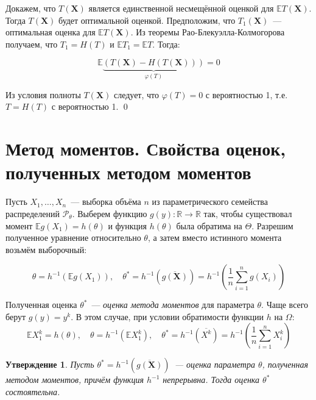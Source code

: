\documentclass[oneside,final,14pt]{extreport}
\renewenvironment{proof}{{\bfseries Доказательство.}}{\qed}
\theoremstyle{plain}
\newtheorem*{thm*}{Утверждение}
\theoremstyle{definition}
\theoremstyle{named}
\begin{document}
\begin{proof}
Докажем, что $T(\mathbf{X})$ является единственной несмещённой оценкой для $\mathbb{E}T(\mathbf{X})$. Тогда $T(\mathbf{X})$ будет оптимальной оценкой. Предположим, что $T_1(\mathbf{X})$~--- оптимальная оценка для $\mathbb{E}T(\mathbf{X})$. Из теоремы Рао-Блекуэлла-Колмогорова получаем, что $T_{1}=H(T)$ и $\mathbb{E} T_{1}=\mathbb{E} T$. Тогда:

\begin{equation*}
    \mathbb{E} \underbrace{(T(\mathbf{X})-H(T(\mathbf{X})))}_{\varphi(T)}=0
\end{equation*}

Из условия полноты $T(\mathbf{X})$ следует, что $\varphi(T)=0$ с вероятностью 1, т.е. $T=H(T)$ с вероятностью 1.
\end{proof}

\section{Метод моментов. Свойства оценок, полученных методом моментов}

Пусть $X_1, \ldots, X_n$~--- выборка объёма $n$ из параметрического семейства распределений $\mathcal{P}_\theta$. Выберем функцию $g(y): \mathbb{R} \rightarrow \mathbb{R}$ так, чтобы существовал момент $\mathbb{E} g\left(X_{1}\right)=h(\theta)$ и функция $h(\theta)$ была обратима на $\Theta$. Разрешим полученное уравнение относительно $\theta$, а затем вместо истинного момента возьмём выборочный:

\begin{equation*}
    \theta=h^{-1}\left(\mathbb{E} g\left(X_{1}\right)\right), \quad \theta^{*}=h^{-1}(\overline{g(\mathbf{X})})=h^{-1}\left(\frac{1}{n} \sum\limits_{i=1}^{n} g\left(X_{i}\right)\right)
\end{equation*}

Полученная оценка $\theta^{*}$~--- {\it оценка метода моментов} для параметра $\theta$. Чаще всего берут $g(y)=y^{k}$. В этом случае, при условии обратимости функции $h$ на $\Omega$:
\begin{equation*}
    \mathbb{E} X_{1}^{k}=h(\theta), \quad \theta=h^{-1}\left(\mathbb{E} X_{1}^{k}\right), \quad \theta^{*}=h^{-1}(\overline{X^{k}})=h^{-1}\left(\frac{1}{n} \sum\limits_{i=1}^{n} X_{i}^{k}\right)
\end{equation*}

\begin{thm*}
Пусть $\theta^{*}=h^{-1}(\overline{g(\mathbf{X})})$~--- оценка параметра $\theta$, полученная методом моментов, причём функция $h^{-1}$ непрерывна. Тогда оценка $\theta^{*}$ состоятельна.
\end{thm*}
\end{document}
